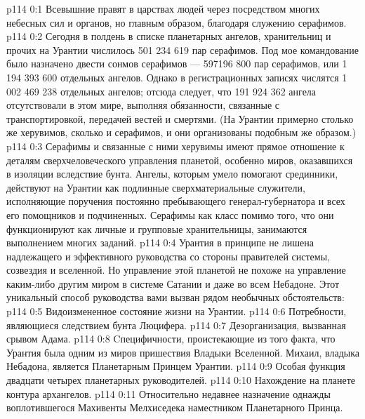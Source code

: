 \author{Глава Серафимов}
\vs p114 0:1 Всевышние правят в царствах людей через посредством многих небесных сил и органов, но главным образом, благодаря служению серафимов.
\vs p114 0:2 Сегодня в полдень в списке планетарных ангелов, хранительниц и прочих на Урантии числилось 501 234 619 пар серафимов. Под мое командование было назначено двести сонмов серафимов --- 597196 800 пар серафимов, или 1 194 393 600 отдельных ангелов. Однако в регистрационных записях числятся 1 002 469 238 отдельных ангелов; отсюда следует, что 191 924 362 ангела отсутствовали в этом мире, выполняя обязанности, связанные с транспортировкой, передачей вестей и смертями. (На Урантии примерно столько же херувимов, сколько и серафимов, и они организованы подобным же образом.)
\vs p114 0:3 Серафимы и связанные с ними херувимы имеют прямое отношение к деталям сверхчеловеческого управления планетой, особенно миров, оказавшихся в изоляции вследствие бунта. Ангелы, которым умело помогают срединники, действуют на Урантии как подлинные сверхматериальные служители, исполняющие поручения постоянно пребывающего генерал\hyp{}губернатора и всех его помощников и подчиненных. Серафимы как класс помимо того, что они функционируют как личные и групповые хранительницы, занимаются выполнением многих заданий.
\vs p114 0:4 Урантия в принципе не лишена надлежащего и эффективного руководства со стороны правителей системы, созвездия и вселенной. Но управление этой планетой не похоже на управление каким\hyp{}либо другим миром в системе Сатании и даже во всем Небадоне. Этот уникальный способ руководства вами вызван рядом необычных обстоятельств:
\vs p114 0:5 \bibnobreakspace Видоизмененное состояние жизни на Урантии.
\vs p114 0:6 \bibnobreakspace Потребности, являющиеся следствием бунта Люцифера.
\vs p114 0:7 \bibnobreakspace Дезорганизация, вызванная срывом Адама.
\vs p114 0:8 \bibnobreakspace Cпецифичности, проистекающие из того факта, что Урантия была одним из миров пришествия Владыки Вселенной. Михаил, владыка Небадона, является Планетарным Принцем Урантии.
\vs p114 0:9 \bibnobreakspace Особая функция двадцати четырех планетарных руководителей.
\vs p114 0:10 \bibnobreakspace Нахождение на планете контура архангелов.
\vs p114 0:11 \bibnobreakspace Относительно недавнее назначение однажды воплотившегося Махивенты Мелхиседека наместником Планетарного Принца.
